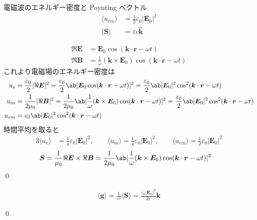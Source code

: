 \documentclass[uplatex,dvipdfmx,a4paper,11pt]{jlreq}
\makeatletter
\newcommand{\EE}{\bm{E}}
\newcommand{\BB}{\bm{B}}
\newcommand{\rr}{\bm{r}}
\newcommand{\kk}{\bm{k}}
\renewcommand{\SS}{\bm{S}}
\numberwithin{equation}{section}
\theoremstyle{definition}
\renewenvironment{proof}[1][\proofname]{\par
  \normalfont
  \topsep6\p@\@plus6\p@ \trivlist
  \item[\hskip\labelsep{\bfseries #1}\@addpunct{\bfseries}]\ignorespaces\quad\par
}{%
  \qed\endtrivlist\@endpefalse
}
\renewcommand\proofname{証明}
\makeatother
\begin{document}
\begin{theorem}[電磁波のエネルギー]
  電磁波のエネルギー密度と Poynting ベクトル
  \begin{align}
    \langle u_{em}\rangle & = \frac{1}{2}\varepsilon_0|\EE_0|^2 \\
    \langle\SS\rangle     & = \overline{\varepsilon}c\hat{\kk}
  \end{align}
\end{theorem}
\begin{proof}
  \begin{align}
    \Re{\EE} & = \EE_0\cos(\kk\cdot\rr - \omega t)                            \\
    \Re{\BB} & = \frac{1}{\omega}(\kk\times\EE_0)\cos(\kk\cdot\rr - \omega t)
  \end{align}
  これより電磁場のエネルギー密度は
  \begin{align}
    u_e    & = \frac{\varepsilon_0}{2}|\Re\EE|^2 = \frac{\varepsilon_0}{2}\ab|\EE_0\cos(\kk\cdot\rr - \omega t)|^2 = \frac{\varepsilon_0}{2}\ab|\EE_0|^2\cos^2(\kk\cdot\rr - \omega t)              \\
    u_m    & = \frac{1}{2\mu_0}|\Re\BB|^2 = \frac{1}{2\mu_0}\ab|\frac{1}{\omega}(\kk\times\EE_0)\cos(\kk\cdot\rr - \omega t)|^2 = \frac{\varepsilon_0}{2}\ab|\EE_0|^2\cos^2(\kk\cdot\rr - \omega t) \\
    u_{em} & = \varepsilon_0\ab|\EE_0|^2\cos^2(\kk\cdot\rr - \omega t)
  \end{align}
  時間平均を取ると
  \begin{alignat}{3}
    \langle u_e\rangle & = \frac{1}{4}\varepsilon_0|\EE_0|^2, \qquad \langle u_m\rangle = \frac{1}{4}\varepsilon_0|\EE_0|^2, \qquad \langle u_{em}\rangle = \frac{1}{2}\varepsilon_0|\EE_0|^2
  \end{alignat}
  \begin{align}
    \SS & = \frac{1}{\mu_0}\Re{\EE}\times\Re{\BB} = \frac{1}{2\mu_0}\ab|\frac{1}{\omega}(\kk\times\EE_0)\cos(\kk\cdot\rr - \omega t)|^2
  \end{align}
\end{proof}

\begin{theorem}[電磁波の運動量]
  \begin{align}
    \langle \bm{g}\rangle = \frac{1}{c^2}\langle\SS\rangle = \frac{\varepsilon_0|\EE_0|^2}{2c}\hat{\kk}
  \end{align}
\end{theorem}
\begin{proof}
\end{proof}
\end{document}
